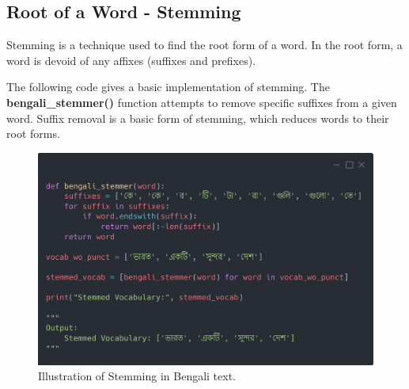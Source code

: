 \subsection{Root of a Word - Stemming}

Stemming is a technique used to find the root form of a word. In the root form, a word is devoid of any affixes (suffixes and prefixes).

The following code gives a basic implementation of stemming. The \textbf{bengali\_stemmer()} function attempts to remove specific suffixes from a given word. Suffix removal is a basic form of stemming, which reduces words to their root forms.

\begin{figure}[H]
    \centering
    \includegraphics[width=0.8\linewidth]{Attachments/Figures/root-of-a-word_figure1.png}
    \caption{Illustration of Stemming in Bengali text.}
\end{figure}